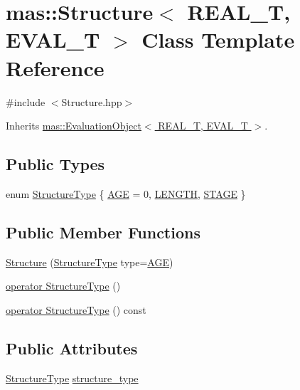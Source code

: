 \hypertarget{classmas_1_1_structure}{}\section{mas\+:\+:Structure$<$ R\+E\+A\+L\+\_\+\+T, E\+V\+A\+L\+\_\+\+T $>$ Class Template Reference}
\label{classmas_1_1_structure}


{\ttfamily \#include $<$Structure.\+hpp$>$}



Inherits \hyperlink{classmas_1_1_evaluation_object}{mas\+::\+Evaluation\+Object$<$ R\+E\+A\+L\+\_\+\+T, E\+V\+A\+L\+\_\+\+T $>$}.

\subsection*{Public Types}
\begin{DoxyCompactItemize}
\item 
enum \hyperlink{classmas_1_1_structure_a727ec3dc2ba5133a94b368ff3fb9f391}{Structure\+Type} \{ \hyperlink{classmas_1_1_structure_a727ec3dc2ba5133a94b368ff3fb9f391ad170bd3595f63a00507e8f6580501aca}{A\+G\+E} = 0, 
\hyperlink{classmas_1_1_structure_a727ec3dc2ba5133a94b368ff3fb9f391a725071afb475725d3735481c0fccbad1}{L\+E\+N\+G\+T\+H}, 
\hyperlink{classmas_1_1_structure_a727ec3dc2ba5133a94b368ff3fb9f391a237b21de429cf518d9a4679693165232}{S\+T\+A\+G\+E}
 \}
\end{DoxyCompactItemize}
\subsection*{Public Member Functions}
\begin{DoxyCompactItemize}
\item 
\hyperlink{classmas_1_1_structure_ae067864a9b6b817a01e100b404362efe}{Structure} (\hyperlink{classmas_1_1_structure_a727ec3dc2ba5133a94b368ff3fb9f391}{Structure\+Type} type=\hyperlink{classmas_1_1_structure_a727ec3dc2ba5133a94b368ff3fb9f391ad170bd3595f63a00507e8f6580501aca}{A\+G\+E})
\item 
\hyperlink{classmas_1_1_structure_ab383d8ceba4053c0d929f185516bd646}{operator Structure\+Type} ()
\item 
\hyperlink{classmas_1_1_structure_afc70ae1bcc21a95db8545c33e41204e5}{operator Structure\+Type} () const 
\end{DoxyCompactItemize}
\subsection*{Public Attributes}
\begin{DoxyCompactItemize}
\item 
\hyperlink{classmas_1_1_structure_a727ec3dc2ba5133a94b368ff3fb9f391}{Structure\+Type} \hyperlink{classmas_1_1_structure_af4c08e01fdddc4c24c10be7b6798b16b}{structure\+\_\+type}
\end{DoxyCompactItemize}
